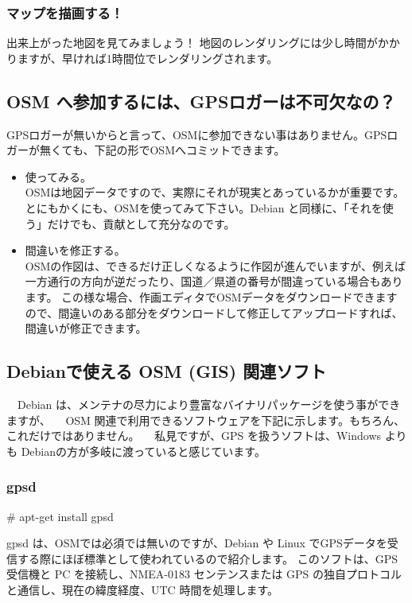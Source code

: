 \documentclass[mingoth,a4paper]{jsarticle}
\begin{document}
\subsubsection{マップを描画する！ }
出来上がった地図を見てみましょう！
地図のレンダリングには少し時間がかかりますが、早ければ1時間位でレンダリングされます。

\subsection{OSM へ参加するには、GPSロガーは不可欠なの？}

GPSロガーが無いからと言って、OSMに参加できない事はありません。GPSロガーが無くても、下記の形でOSMへコミットできます。

\begin{itemize}
 \item 使ってみる。\\
OSMは地図データですので、実際にそれが現実とあっているかが重要です。とにもかくにも、OSMを使ってみて下さい。Debian と同様に、「それを使う」だけでも、貢献として充分なのです。
 \item 間違いを修正する。\\
OSMの作図は、できるだけ正しくなるように作図が進んでいますが、例えば一方通行の方向が逆だったり、国道／県道の番号が間違っている場合もあります。
この様な場合、作画エディタでOSMデータをダウンロードできますので、間違いのある部分をダウンロードして修正してアップロードすれば、間違いが修正できます。
\end{itemize}

\subsection{Debianで使える OSM (GIS) 関連ソフト}
　Debian は、メンテナの尽力により豊富なバイナリパッケージを使う事ができますが、
　OSM 関連で利用できるソフトウェアを下記に示します。もちろん、これだけではありません。
　私見ですが、GPS を扱うソフトは、Windows よりも Debianの方が多岐に渡っていると感じています。

\subsubsection{gpsd}

\begin{commandline}
# apt-get install gpsd
\end{commandline}

gpsd は、OSMでは必須では無いのですが、Debian や Linux でGPSデータを受信する際にほぼ標準として使われているので紹介します。
このソフトは、GPS 受信機と PC を接続し、NMEA-0183 センテンスまたは GPS の独自プロトコルと通信し、現在の緯度経度、UTC 時間を処理します。
\end{document}
